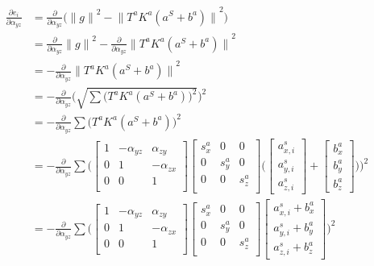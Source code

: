 \documentclass{article}
\begin{document}
{\small
\begin{align*}
  \frac{\partial e_i}{\partial \alpha_{yz}} &= \frac{\partial}{\partial \alpha_{yz}}\Big({\lVert g\rVert}^2-{\lVert T^aK^a(a^S+b^a)\rVert}^2\Big) \\
  &= \frac{\partial}{\partial \alpha_{yz}}{\lVert g\rVert}^2-\frac{\partial}{\partial \alpha_{yz}}{\lVert T^aK^a(a^S+b^a)\rVert}^2 \\
  &= -\frac{\partial}{\partial \alpha_{yz}}{\lVert T^aK^a(a^S+b^a)\rVert}^2 \\
  &= -\frac{\partial}{\partial \alpha_{yz}}\Bigg(\sqrt{\sum{\Big(T^aK^a(a^S+b^a)\Big)^2}}\Bigg)^2 \\
  &= -\frac{\partial}{\partial \alpha_{yz}}\sum{\Big(T^aK^a(a^S+b^a)\Big)^2} \\
  &= -\frac{\partial}{\partial \alpha_{yz}}\sum{\Bigg(\begin{bmatrix}1&-\alpha_{yz}&\alpha_{zy}\\0&1&-\alpha_{zx}\\0&0&1\\\end{bmatrix}\begin{bmatrix}s_x^a&0&0\\0&s_y^a&0\\0&0&s_z^a\\\end{bmatrix}\Bigg(\begin{bmatrix}a_{x,i}^s\\a_{y,i}^s\\a_{z,i}^s\end{bmatrix}+\begin{bmatrix}b_x^a\\b_y^a\\b_z^a\end{bmatrix}\Bigg)\Bigg)^2} \\
  &= -\frac{\partial}{\partial \alpha_{yz}}\sum{\Bigg(\begin{bmatrix}1&-\alpha_{yz}&\alpha_{zy}\\0&1&-\alpha_{zx}\\0&0&1\\\end{bmatrix}\begin{bmatrix}s_x^a&0&0\\0&s_y^a&0\\0&0&s_z^a\\\end{bmatrix}\begin{bmatrix}a_{x,i}^s+b_x^a\\a_{y,i}^s+b_y^a\\a_{z,i}^s+b_z^a\end{bmatrix}\Bigg)^2} \\

\end{align*}}
\end{document}
